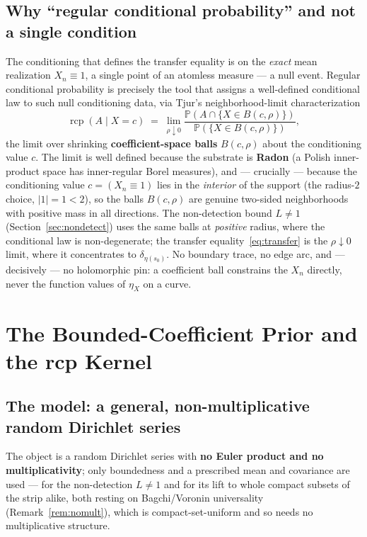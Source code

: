 \documentclass[11pt,a4paper]{article}
\theoremstyle{definition}
\newcommand{\etaX}{\eta_X}
\newcommand{\rcp}{\operatorname{rcp}}
\begin{document}
\subsection{Why ``regular conditional probability'' and not a single condition}

The conditioning that defines the transfer equality is on the \emph{exact} mean realization
\(X_n\equiv1\), a single point of an atomless measure --- a null event. Regular conditional
probability is precisely the tool that assigns a well-defined conditional law to such null
conditioning data, via Tjur's neighborhood-limit characterization
\begin{equation}\label{eq:tjur}
  \rcp(A \mid X = c)
  \;=\; \lim_{\rho \downarrow 0} \frac{\mathbb{P}(A \cap \{X\in B(c,\rho)\})}{\mathbb{P}(\{X\in B(c,\rho)\})},
\end{equation}
the limit over shrinking \textbf{coefficient-space balls} \(B(c,\rho)\) about the
conditioning value \(c\). The limit is well defined because the substrate is \textbf{Radon}
(a Polish inner-product space has inner-regular Borel measures), and --- crucially --- because
the conditioning value \(c=(X_n\equiv1)\) lies in the \emph{interior} of the support (the
radius-\(2\) choice, \(|1|=1<2\)), so the balls \(B(c,\rho)\) are genuine two-sided neighborhoods with
positive mass in all directions. The non-detection bound \(L\neq1\)
(Section~\ref{sec:nondetect}) uses the same balls at \emph{positive} radius, where the
conditional law is non-degenerate; the transfer equality~\eqref{eq:transfer} is the
\(\rho\downarrow0\) limit, where it concentrates to \(\delta_{\eta(s_0)}\). No boundary trace,
no edge arc, and --- decisively --- no holomorphic pin: a coefficient ball constrains the
\(X_n\) directly, never the function values of \(\etaX\) on a curve.

\section{The Bounded-Coefficient Prior and the rcp Kernel}

\subsection{The model: a general, non-multiplicative random Dirichlet series}\label{sec:model}

The object is a random Dirichlet series with \textbf{no Euler product and no multiplicativity};
only boundedness and a prescribed mean and covariance are used --- for the non-detection
\(L\neq1\) and for its lift to whole compact subsets of the strip alike, both resting on
Bagchi/Voronin universality (Remark~\ref{rem:nomult}), which is compact-set-uniform and so needs
no multiplicative structure.
\end{document}
